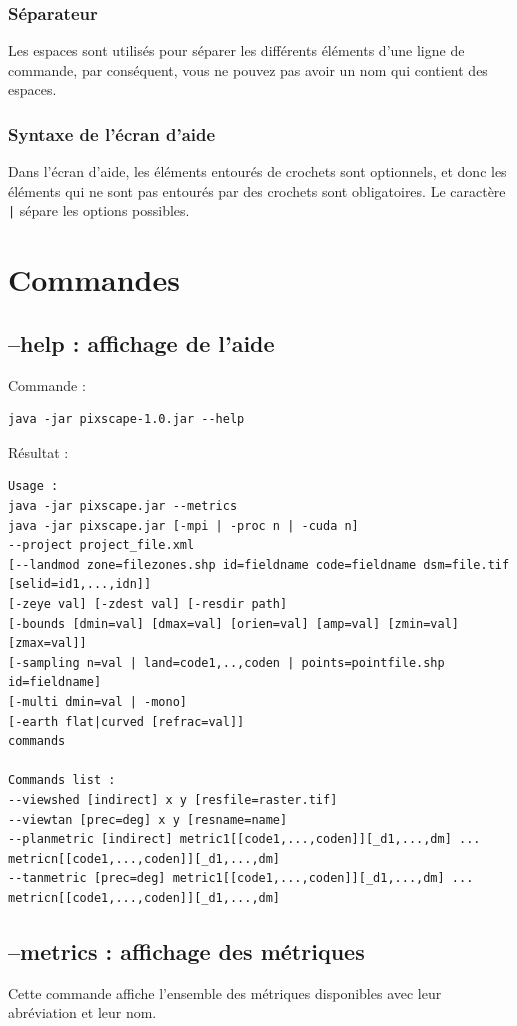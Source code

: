 \documentclass{report}
\begin{document}
\subsubsection{Séparateur}
Les espaces sont utilisés pour séparer les différents éléments d'une ligne de commande, par conséquent, vous ne pouvez pas avoir un nom qui contient des espaces.\\

\subsubsection{Syntaxe de l'écran d'aide}
Dans l'écran d'aide, les éléments entourés de crochets sont optionnels, et donc les éléments qui ne sont pas entourés par des crochets sont obligatoires. Le caractère \verb+|+ sépare les options possibles.

\section{Commandes}

\subsection{--help : affichage de l'aide}
Commande :
\begin{Verbatim}
java -jar pixscape-1.0.jar --help
\end{Verbatim}
Résultat :
\begin{Verbatim}
Usage :
java -jar pixscape.jar --metrics
java -jar pixscape.jar [-mpi | -proc n | -cuda n]
--project project_file.xml
[--landmod zone=filezones.shp id=fieldname code=fieldname dsm=file.tif [selid=id1,...,idn]]
[-zeye val] [-zdest val] [-resdir path]
[-bounds [dmin=val] [dmax=val] [orien=val] [amp=val] [zmin=val] [zmax=val]]
[-sampling n=val | land=code1,..,coden | points=pointfile.shp id=fieldname]
[-multi dmin=val | -mono]
[-earth flat|curved [refrac=val]]
commands

Commands list :
--viewshed [indirect] x y [resfile=raster.tif]
--viewtan [prec=deg] x y [resname=name]
--planmetric [indirect] metric1[[code1,...,coden]][_d1,...,dm] ... metricn[[code1,...,coden]][_d1,...,dm]
--tanmetric [prec=deg] metric1[[code1,...,coden]][_d1,...,dm] ... metricn[[code1,...,coden]][_d1,...,dm]
\end{Verbatim}

\subsection{--metrics : affichage des métriques}
Cette commande affiche l'ensemble des métriques disponibles avec leur abréviation et leur nom. 
\end{document}

